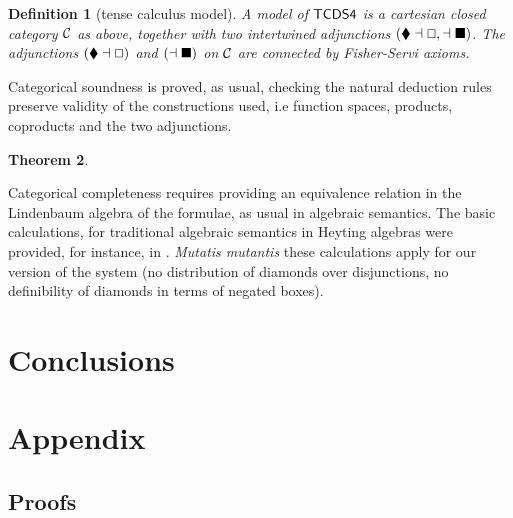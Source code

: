 \documentclass{article}
\let\Diamond\relax
\newcommand{\bLozenge}{\mathbin{\blacklozenge}}
\renewcommand{\Box}{\oblong}
\newtheorem{theorem}{Theorem}
\newtheorem{definition}[theorem]{Definition}
\begin{document}
\begin{definition}[tense calculus model]
A model of $\sf{TCDS4}$ is a cartesian closed category $\cal{C}$ as above, together with two intertwined adjunctions $(\bLozenge\dashv \Box, \Diamond\dashv \blacksquare)$.  The adjunctions $(\bLozenge\dashv \Box)$ and $(\Diamond\dashv \blacksquare)$ on $\cal{C}$ are connected by Fisher-Servi axioms. 
\end{definition}

Categorical soundness is proved, as usual, checking the natural deduction rules preserve validity of the constructions used, i.e function spaces, products, coproducts and the two adjunctions. 

\begin{theorem}

\end{theorem}

Categorical completeness requires providing an equivalence relation in the Lindenbaum algebra of the formulae, as usual in algebraic semantics. The basic calculations, for traditional algebraic semantics in Heyting algebras were provided, for instance, in \cite{figallo2014}. \textit{Mutatis mutantis} these calculations apply for our version of the system (no distribution of diamonds over disjunctions, no definibility of diamonds in terms of negated boxes).


\section{Conclusions}





\appendix

\section{Appendix}
\label{sec:appendix}

\subsection{Proofs}
\label{subsec:proofs}


\end{document}
